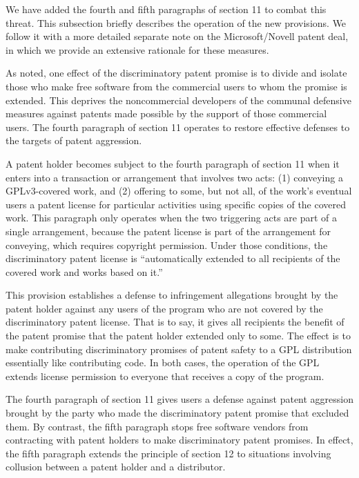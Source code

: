 We have added the fourth and fifth paragraphs of section 11 to combat
this threat.  This subsection briefly describes the operation of the new
provisions.  We follow it with a more detailed separate note on the
Microsoft/Novell patent deal, in which we provide an extensive rationale
for these measures.

As noted, one effect of the discriminatory patent promise is to divide
and isolate those who make free software from the commercial users to
whom the promise is extended.  This deprives the noncommercial
developers of the communal defensive measures against patents made
possible by the support of those commercial users.  The fourth paragraph
of section 11 operates to restore effective defenses to the targets of
patent aggression.

A patent holder becomes subject to the fourth paragraph of section 11
when it enters into a transaction or arrangement that involves two acts:
(1) conveying a GPLv3-covered work, and (2) offering to some, but not
all, of the work's eventual users a patent license for particular
activities using specific copies of the covered work.  This paragraph
only operates when the two triggering acts are part of a single
arrangement, because the patent license is part of the arrangement for
conveying, which requires copyright permission.  Under those conditions,
the discriminatory patent license is ``automatically extended to all
recipients of the covered work and works based on it.''

This provision establishes a defense to infringement allegations brought
by the patent holder against any users of the program who are not
covered by the discriminatory patent license.  That is to say, it gives
all recipients the benefit of the patent promise that the patent holder
extended only to some. The effect is to make contributing discriminatory
promises of patent safety to a GPL distribution essentially like
contributing code. In both cases, the operation of the GPL extends
license permission to everyone that receives a copy of the program.


The fourth paragraph of section 11 gives users a defense against patent
aggression brought by the party who made the discriminatory patent
promise that excluded them. By contrast, the fifth paragraph stops free
software vendors from contracting with patent holders to make
discriminatory patent promises.  In effect, the fifth paragraph extends
the principle of section 12 to situations involving collusion between a
patent holder and a distributor.

